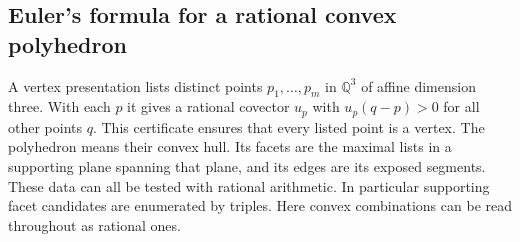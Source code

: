 \subsection{Euler's formula for a rational convex polyhedron}
A vertex presentation lists distinct points $p_1,\dots,p_m$ in
$\mathbb Q^3$ of affine dimension three. With each $p$ it gives a
rational covector $u_p$ with $u_p(q-p)>0$ for all other points $q$.
This certificate ensures that every listed point is a vertex. The
polyhedron means their convex hull. Its facets are the maximal lists
in a supporting plane spanning that plane, and its edges are its
exposed segments. These data can all be tested with rational arithmetic.
In particular supporting facet candidates are enumerated by triples.
Here convex combinations can be read throughout as rational ones.

